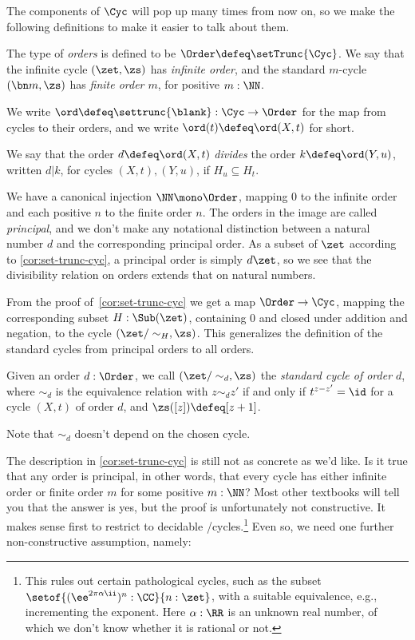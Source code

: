 The components of $\Cyc$ will pop up many times from now on,
so we make the following definitions to make it easier to talk about them.
\begin{definition}\label{def:Order}
  The type of \emph{orders} is defined to be
  $\Order\defeq\setTrunc{\Cyc}$.
  We say that the infinite cycle $(\zet,\zs)$ has \emph{infinite order},
  and the standard $m$-cycle $(\bn m,\zs)$ has \emph{finite order $m$},
  for positive $m:\NN$.

  We write $\ord\defeq\settrunc{\blank}:\Cyc\to\Order$ for the map
  from cycles to their orders, and we write $\ord(t)\defeq\ord(X,t)$ for short.

  We say that the order $d\defeq\ord(X,t)$ \emph{divides} the
  order $k\defeq\ord(Y,u)$, written $d | k$,
  for cycles $(X,t),(Y,u)$, if $H_u \subseteq H_t$.
\end{definition}
We have a canonical injection $\NN \mono \Order$,
mapping $0$ to the infinite order and each positive $n$ to the finite order $n$.
The orders in the image are called \emph{principal},
and we don't make any notational distinction between a natural number $d$
and the corresponding principal order.
As a subset of $\zet$ according to \cref{cor:set-trunc-cyc},
a principal order is simply $d\zet$,
so we see that the divisibility relation on orders extends
that on natural numbers.

From the proof of~\cref{cor:set-trunc-cyc} we get a map
$\Order \to \Cyc$, mapping the corresponding subset $H:\Sub(\zet)$,
containing $0$ and closed under addition and negation, to the cycle
$(\zet/\sim_H, \zs)$.
This generalizes the definition of the standard
cycles from principal orders to all orders.
\begin{definition}\label{def:standard-cycle}
  Given an order $d:\Order$, we call $(\zet/\sim_d, \zs)$
  the \emph{standard cycle of order $d$}, where $\sim_d$ is the
  equivalence relation with $z \sim_d z'$ if and only if
  $t^{z-z'} = \id$ for a cycle $(X,t)$ of order $d$,
  and $\zs([z]) \defeq [z+1]$.
\end{definition}
Note that $\sim_d$ doesn't depend on the chosen cycle.

The description in \cref{cor:set-trunc-cyc} is still not as concrete as we'd like.
Is it true that any order is principal, in other words,
that every cycle has either infinite order or finite order $m$
for some positive $m:\NN$?
Most other textbooks will tell you that the answer is yes,
but the proof is unfortunately not constructive.
It makes sense first to restrict to decidable \coverings/cycles.\footnote{%
  This rules out certain pathological cycles,
  such as the subset $\setof{(\ee^{2\pi\alpha\ii})^n:\CC}{n:\zet}$,
  with a suitable equivalence, e.g., incrementing the exponent.
  Here $\alpha:\RR$ is an unknown real number,
  of which we don't know whether it is rational or not.}
Even so, we need one further non-constructive assumption, namely:


